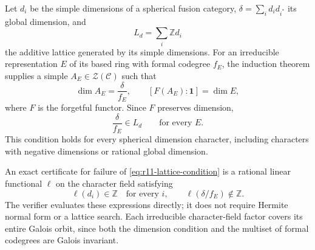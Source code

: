 Let $d_i$ be the simple dimensions of a spherical fusion category,
$\delta=\sum_i d_i d_{i^*}$ its global dimension, and
\[
 L_d=\sum_i\mathbb Z d_i
\]
the additive lattice generated by its simple dimensions. For an
irreducible representation $E$ of its based ring with formal codegree
$f_E$, the induction theorem
\cite[Theorem~2.13]{OstrikPivotal} supplies a simple
$A_E\in\mathcal Z(\mathcal C)$ such that
\begin{equation}\label{eq:r11-central-dimension}
 \dim A_E=\frac{\delta}{f_E},\qquad
 [F(A_E):\mathbf1]=\dim E,
\end{equation}
where $F$ is the forgetful functor. Since $F$ preserves dimension,
\begin{equation}\label{eq:r11-lattice-condition}
 \frac{\delta}{f_E}\in L_d
 \qquad\text{for every }E.
\end{equation}
This condition holds for every spherical dimension character, including
characters with negative dimensions or rational global dimension.

An exact certificate for failure of
\eqref{eq:r11-lattice-condition} is a rational linear functional
$\ell$ on the character field satisfying
\[
 \ell(d_i)\in\mathbb Z\quad\text{for every }i,
 \qquad \ell(\delta/f_E)\notin\mathbb Z.
\]
The verifier evaluates these expressions directly; it does not require
Hermite normal form or a lattice search. Each irreducible character-field
factor covers its entire Galois orbit, since both the dimension condition
and the multiset of formal codegrees are Galois invariant.

